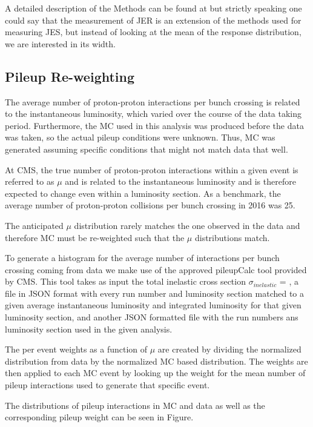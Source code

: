 A detailed description of the Methods can be found at \cite{jes_jer} but strictly speaking one could say that the measurement of JER is an extension of the methods used for measuring JES, but instead of looking at the mean of the response distribution, we are interested in its width.

\subsection{Pileup Re-weighting}
The average number of proton-proton interactions per bunch crossing is related to the instantaneous luminosity, which varied over the course of the data taking period. Furthermore, the MC used in this analysis was produced before the data was taken, so the actual pileup conditions were unknown. Thus, MC was generated assuming specific conditions that might not match data that well. 

At CMS, the true number of proton-proton interactions within a given event is referred to as $\mu$ and is related to the instantaneous luminosity and is therefore expected to change even within a luminosity section. As a benchmark, the average number of proton-proton collisions per bunch crossing in 2016 was 25.

The anticipated $\mu$ distribution rarely matches the one observed in the data and therefore MC must be re-weighted such that the $\mu$ distributions match.


To generate a histogram for the average number of interactions per bunch crossing coming from data we make use of the approved pileupCalc tool provided by CMS. This tool takes as input the total inelastic cross section $\sigma_{inelastic}$ = , a file in JSON format with every run number and luminosity section matched to a given average instantaneous luminosity and integrated luminosity for that given luminosity section, and another JSON formatted file with the run numbers ans luminosity section used in the given analysis. 

The per event weights as a function of $\mu$ are created by dividing the normalized distribution from data by the normalized MC based distribution. The weights are then applied to each MC event by looking up the weight for the mean number of pileup interactions used to generate that specific event.


The distributions of pileup interactions in MC and data as well as the corresponding pileup weight can be seen in Figure.

